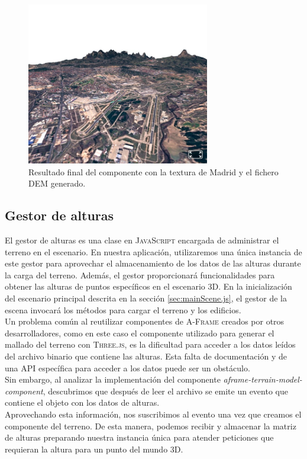 \documentclass[a4paper, 11pt]{book}
\begin{document}
\begin{figure}[h]
  \centering
  \includegraphics[width=8cm, keepaspectratio]{img/madrid_terrain.jpg}
  \caption{Resultado final del componente con la textura de Madrid y el fichero DEM generado.}
  \label{fig:demAframe}
\end{figure}

\subsection{Gestor de alturas}
\label{subsec:heightManager}
El gestor de alturas es una clase en \textsc{JavaScript} encargada de administrar el terreno en el escenario. En nuestra aplicación, utilizaremos una única instancia de este gestor para aprovechar el almacenamiento de los datos de las alturas durante la carga del terreno. Además, el gestor proporcionará funcionalidades para obtener las alturas de puntos específicos en el escenario \textsc{3D}. En la inicialización del escenario principal descrita en la sección \ref{sec:mainScene.js}, el gestor de la escena invocará los métodos para cargar el terreno y los edificios.\\
Un problema común al reutilizar componentes de \textsc{A-Frame} creados por otros desarrolladores, como en este caso el componente utilizado para generar el mallado del terreno con \textsc{Three.js}, es la dificultad para acceder a los datos leídos del archivo binario que contiene las alturas. Esta falta de documentación y de una API específica para acceder a los datos puede ser un obstáculo.\\
Sin embargo, al analizar la implementación del componente \emph{aframe-terrain-model-component}, descubrimos que después de leer el archivo se emite un evento que contiene el objeto con los datos de alturas.\\
Aprovechando esta información, nos suscribimos al evento una vez que creamos el componente del terreno. De esta manera, podemos recibir y almacenar la matriz de alturas preparando nuestra instancia única para atender peticiones que requieran la altura para un punto del mundo 3D.
\end{document}
